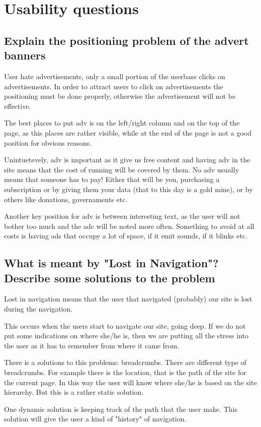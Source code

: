 \section{Usability questions}
\subsection{Explain the positioning problem of the advert banners}
User hate advertisements, only a small portion of the userbase clicks on advertisements.
In order to attract users to click on advertisements the positioning must be done properly, otherwise the advertisement will not be effective.

The best places to put adv is on the left/right column and on the top of the page, as this places are rather visible, while at the end of the page is not a good position for obvious reasons.

Unintuetevely, adv is important as it give us free content and having adv in the site means that the cost of running will be covered by them. No adv usually means that someone has to pay! Either that will be you, purchasing a subscription or by giving them your data (that to this day is a gold mine), or by others like donations, governaments etc.

Another key position for adv is between interesting text, as the user will not bother too much and the adc will be noted more often. 
Something to avoid at all costs is having ads that occupy a lot of space, if it emit sounds, if it blinks etc.

\subsection{What is meant by "Lost in Navigation"? Describe some solutions to the problem}
Lost in navigation means that the user that navigated (probably) our site is lost during the navigation.

This occurs when the users start to navigate our site, going deep. If we do not put some indications on where she/he is, then we are putting all the stress into the user as it has to remember from where it came from.

There is a solutions to this problems: breadcrumbs. There are different type of breadcrumbs. For example there is the location, that is the path of the site for the current page. In this way the user will know where she/he is based on the site hierarchy. But this is a rather static solution.

One dynamic solution is keeping track of the path that the user make. This solution will give the user a kind of "history" of navigation.

